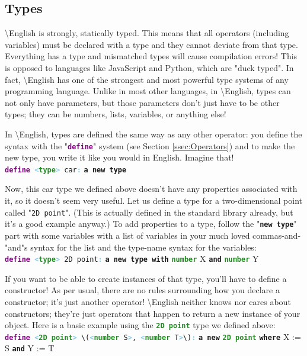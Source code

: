\documentclass{article}
\newcommand{\English}{\textbackslash{}English}				%
\newcommand{\ssecl}[1]{\subsection{#1}\label{ssec:#1}}
\newcommand{\type}[1]{\texttt{\textcolor{ForestGreen}{\textbf{#1}}}}
\newcommand{\keyop}[1]{\texttt{\textcolor{Purple}{\textbf{#1}}}}
\newcommand{\common}[1]{\texttt{\textcolor{Mulberry}{\textbf{#1}}}}
\newcommand{\defpunct}[1]{\texttt{\textcolor{SkyBlue}{\textbf{#1}}}}
\newcommand{\codespecial}[1]{\texttt{\textcolor{CarnationPink}{#1}}}
\newcommand{\define}[2]{\texttt{\keyop{define} \defpunct{<}#1\defpunct{>} #2\defpunct{:}}}
\newenvironment{code}[0]
{\ttfamily{}				%
\setlength\parindent{0cm}	%
~\\}
{\setlength\parindent{1cm}
~\\}
\begin{document}
\ssecl{Types}
\indent \English{} is strongly, statically typed. This means that all operators (including variables) must be declared with a type and they cannot deviate from that type. Everything has a type and mismatched types will cause compilation errors! This is opposed to languages like JavaScript and Python, which are "duck typed".
\indent In fact, \English{} has one of the strongest and most powerful type systems of any programming language. Unlike in most other languages, in \English{}, types can not only have parameters, but those parameters don't just have to be other types; they can be numbers, lists, variables, or anything else!

\indent In \English{}, types are defined the same way as any other operator: you define the syntax with the "\keyop{define}" system (see Section \ref{ssec:Operators}) and to make the new type, you write it like you would in English. Imagine that!
\begin{code}
\define{\type{type}}{car}
\qquad{}\common{a new type}
\end{code}

\indent Now, this car type we defined above doesn't have any properties associated with it, so it doesn't seem very useful. Let us define a type for a two-dimensional point called "\texttt{2D point}". (This is actually defined in the standard library already, but it's a good example anyway.) To add properties to a type, follow the "\common{new type}" part with some variables with a list of variables in your much loved commas-and-"and"s syntax for the list and the type-name syntax for the variables:
\begin{code}
\define{\type{type}}{2D point}
\qquad{}\common{a new type with} \type{number} X \common{and} \type{number} Y
\end{code}

\indent If you want to be able to create instances of that type, you'll have to define a constructor! As per usual, there are no rules surrounding how you declare a constructor; it's just another operator! \English{} neither knows nor cares about constructors; they're just operators that happen to return a new instance of your object.
\indent Here is a basic example using the \type{2D point} type we defined above:
\begin{code}
\define{\type{2D point}}{\codespecial{\textbackslash}(\defpunct{<}\type{number} S\defpunct{>}, \defpunct{<}\type{number} T\defpunct{>}\codespecial{\textbackslash})}
\qquad{}\common{a new} \type{2D point} \common{where} X := S \common{and} Y := T
\end{code}
\end{document}
